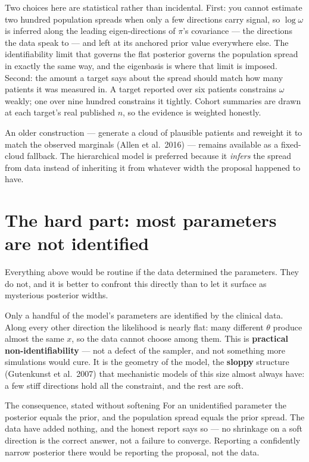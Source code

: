 \documentclass[11pt]{article}
\newcommand{\vocab}[1]{\textcolor{vocabc}{\textbf{#1}}}
\renewcommand{\th}{\theta}
\begin{document}
Two choices here are statistical rather than incidental. First: you cannot estimate two
hundred population spreads when only a few directions carry signal, so $\log\omega$ is
inferred along the leading eigen-directions of $\pi$'s covariance --- the directions the
data speak to --- and left at its anchored prior value everywhere else. The
identifiability limit that governs the flat posterior governs the population spread in
exactly the same way, and the eigenbasis is where that limit is imposed. Second: the
amount a target says about the spread should match how many patients it was measured in.
A target reported over six patients constrains $\omega$ weakly; one over nine hundred
constrains it tightly. Cohort summaries are drawn at each target's real published $n$, so
the evidence is weighted honestly.

An older construction --- generate a cloud of plausible patients and reweight it to match
the observed marginals (Allen et al.\ 2016) --- remains available as a fixed-cloud
fallback. The hierarchical model is preferred because it \emph{infers} the spread from
data instead of inheriting it from whatever width the proposal happened to have.

\section{The hard part: most parameters are not identified}

Everything above would be routine if the data determined the parameters. They do not, and
it is better to confront this directly than to let it surface as mysterious posterior
widths.

Only a handful of the model's parameters are identified by the clinical data. Along
every other direction the likelihood is nearly flat: many different $\th$ produce almost
the same $x$, so the data cannot choose among them. This is \vocab{practical non-identifiability} --- not a defect of the sampler, and
not something more simulations would cure. It is the geometry of the model, the
\vocab{sloppy} structure (Gutenkunst et al.\ 2007) that mechanistic models of this size
almost always have: a few stiff directions hold all the constraint, and the rest are
soft.

\begin{hardbox}{The consequence, stated without softening}
For an unidentified parameter the posterior equals the prior, and the population spread
equals the prior spread. The data have added nothing, and the honest report says so ---
no shrinkage on a soft direction is the correct answer, not a failure to converge.
Reporting a confidently narrow posterior there would be reporting the proposal, not the
data.
\end{hardbox}
\end{document}
